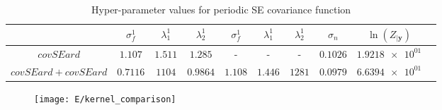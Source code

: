 \documentclass[11pt]{article}
\begin{document}
\begin{table*}[h]
    \centering
    \small
    \begin{tabular}{|c|c|c|c|c|c|c|c|c|c|}
        \hline
         & $\sigma_f^1$ & $\lambda_1^1$ & $\lambda_2^1$ & $\sigma_f^1$ & $\lambda_1^1$ & $\lambda_2^1$ & $\sigma_n$ & $\ln(Z_{|\textbf{y}})$ \\
        \hline
        $covSEard$ & $1.107$ & $1.511$ & $1.285$ & - & - & - & $0.1026$ & $\num{1.9218e+01}$ \\ 
        $covSEard + covSEard$ & $0.7116$ & $1104$ & $0.9864$ & $1.108$ & $1.446$ & $1281$ & $0.0979$ & $\num{6.6394e+01}$ \\
        \hline
    \end{tabular}
    \caption{Hyper-parameter values for periodic SE covariance function}
    \label{table:E_hyper_parameters}
\end{table*}

\begin{figure}[h]
    \centering
    \texttt{[image: E/kernel\_comparison]}
    \caption{}
    \label{fig:E_kernel_compare}
\end{figure}

    
\end{document}
